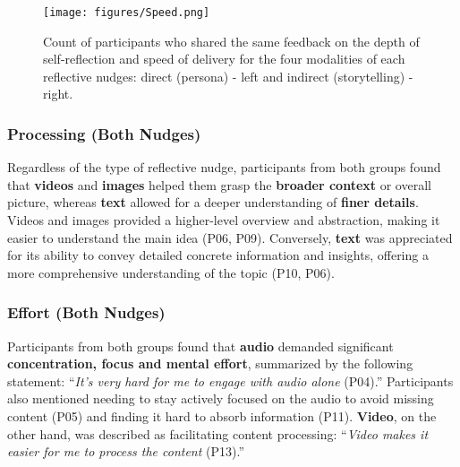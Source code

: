 \begin{figure*}[!htbp]
  \centering
  \texttt{[image: figures/Speed.png]}
  \caption{Count of participants who shared the same feedback on the depth of self-reflection and speed of delivery for the four modalities of each reflective nudges: direct (persona) - left and indirect (storytelling) - right.}
  \label{fig: speed}
\end{figure*}

\subsubsection{Processing (Both Nudges)}
Regardless of the type of reflective nudge, participants from both groups found that \textbf{videos} and \textbf{images} helped them grasp the \textbf{broader context} or overall picture, whereas \textbf{text} allowed for a deeper understanding of \textbf{finer details}. Videos and images provided a higher-level overview and abstraction, making it easier to understand the main idea (P06, P09). Conversely, \textbf{text} was appreciated for its ability to convey detailed concrete information and insights, offering a more comprehensive understanding of the topic (P10, P06).

\subsubsection{Effort (Both Nudges)}
Participants from both groups found that \textbf{audio} demanded significant \textbf{concentration, focus and mental effort}, summarized by the following statement: ``\textit{It’s very hard for me to engage with audio alone} (P04).'' %
Participants also mentioned needing to stay actively focused on the audio to avoid missing content (P05) and finding it hard to absorb information (P11).
\textbf{Video}, on the other hand, was described as facilitating content processing: ``\textit{Video makes it easier for me to process the content} (P13).''


